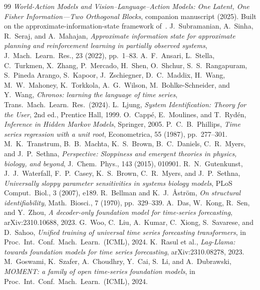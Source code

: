 \documentclass[10pt]{article}
\theoremstyle{plain}
\theoremstyle{definition}
\theoremstyle{remark}
\begin{document}
\begin{thebibliography}{99}
\small\setlength{\itemsep}{1pt}
 \emph{World-Action Models and Vision--Language--Action Models:
  One Latent, One Fisher Information---Two Orthogonal Blocks}, companion
  manuscript (2025). Built on the approximate-information-state framework
  of~\cite{ais2022}.
 J.~Subramanian, A.~Sinha, R.~Seraj, and A.~Mahajan,
  \emph{Approximate information state for approximate planning and reinforcement
  learning in partially observed systems}, J.~Mach.~Learn.~Res., 23 (2022),
  pp.~1--83.
 A.~F.~Ansari, L.~Stella, C.~Turkmen, X.~Zhang, P.~Mercado,
  H.~Shen, O.~Shchur, S.~S.~Rangapuram, S.~Pineda Arango, S.~Kapoor,
  J.~Zschiegner, D.~C.~Maddix, H.~Wang, M.~W.~Mahoney, K.~Torkkola,
  A.~G.~Wilson, M.~Bohlke-Schneider, and Y.~Wang, \emph{Chronos: learning the
  language of time series}, Trans.~Mach.~Learn.~Res.~(2024).
 L.~Ljung, \emph{System Identification: Theory for the User},
  2nd ed., Prentice Hall, 1999.
 O.~Capp\'e, E.~Moulines, and T.~Ryd\'en, \emph{Inference in
  Hidden Markov Models}, Springer, 2005.
 P.~C.~B.~Phillips, \emph{Time series regression with a
  unit root}, Econometrica, 55 (1987), pp.~277--301.
 M.~K.~Transtrum, B.~B.~Machta, K.~S.~Brown,
  B.~C.~Daniels, C.~R.~Myers, and J.~P.~Sethna, \emph{Perspective: Sloppiness
  and emergent theories in physics, biology, and beyond}, J.~Chem.~Phys., 143
  (2015), 010901.
 R.~N.~Gutenkunst, J.~J.~Waterfall, F.~P.~Casey,
  K.~S.~Brown, C.~R.~Myers, and J.~P.~Sethna, \emph{Universally sloppy parameter
  sensitivities in systems biology models}, PLoS Comput.~Biol., 3 (2007), e189.
 R.~Bellman and K.~J.~{\AA}str\"om, \emph{On structural
  identifiability}, Math.~Biosci., 7 (1970), pp.~329--339.
 A.~Das, W.~Kong, R.~Sen, and Y.~Zhou, \emph{A decoder-only
  foundation model for time-series forecasting}, arXiv:2310.10688, 2023.
 G.~Woo, C.~Liu, A.~Kumar, C.~Xiong, S.~Savarese, and D.~Sahoo,
  \emph{Unified training of universal time series forecasting transformers},
  in Proc.~Int.~Conf.~Mach.~Learn.~(ICML), 2024.
 K.~Rasul et al., \emph{Lag-Llama: towards foundation models
  for time series forecasting}, arXiv:2310.08278, 2023.
 M.~Goswami, K.~Szafer, A.~Choudhry, Y.~Cai, S.~Li, and
  A.~Dubrawski, \emph{MOMENT: a family of open time-series foundation models},
  in Proc.~Int.~Conf.~Mach.~Learn.~(ICML), 2024.
\end{thebibliography}
\end{document}
